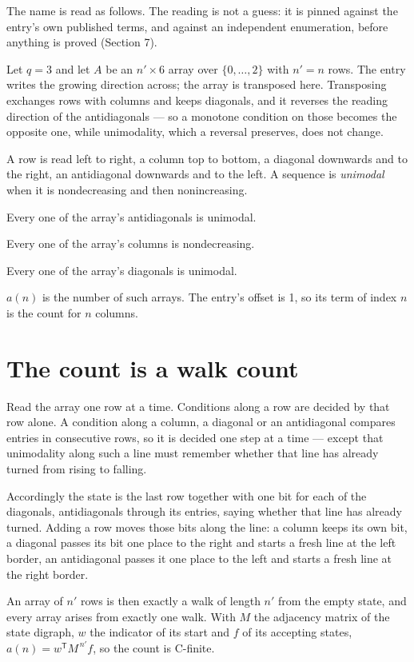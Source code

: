 \documentclass[11pt]{article}
\theoremstyle{definition}
\begin{document}
The name is read as follows. The reading is not a guess: it is pinned against the entry's own published terms, and against an independent enumeration, before anything is proved (Section 7).

Let $q = 3$ and let $A$ be an $n' \times 6$ array over $\{0,\dots,2\}$ with $n' = n$ rows. The entry writes the growing direction across; the array is transposed here. Transposing exchanges rows with columns and keeps diagonals, and it reverses the reading direction of the antidiagonals --- so a monotone condition on those becomes the opposite one, while unimodality, which a reversal preserves, does not change.

A row is read left to right, a column top to bottom, a diagonal downwards and to the right, an antidiagonal downwards and to the left. A sequence is {\itshape unimodal} when it is nondecreasing and then nonincreasing.

Every one of the array's antidiagonals is unimodal.

Every one of the array's columns is nondecreasing.

Every one of the array's diagonals is unimodal.

$a(n)$ is the number of such arrays. The entry's offset is 1, so its term of index $n$ is the count for $n$ columns.

\section{The count is a walk count}

Read the array one row at a time. Conditions along a row are decided by that row alone. A condition along a column, a diagonal or an antidiagonal compares entries in consecutive rows, so it is decided one step at a time --- except that unimodality along such a line must remember whether that line has already turned from rising to falling.

Accordingly the state is the last row together with one bit for each of the diagonals, antidiagonals through its entries, saying whether that line has already turned. Adding a row moves those bits along the line: a column keeps its own bit, a diagonal passes its bit one place to the right and starts a fresh line at the left border, an antidiagonal passes it one place to the left and starts a fresh line at the right border.

An array of $n'$ rows is then exactly a walk of length $n'$ from the empty state, and every array arises from exactly one walk. With $M$ the adjacency matrix of the state digraph, $w$ the indicator of its start and $f$ of its accepting states, $a(n) = w^{\mathsf T}M^{\,n'}f$, so the count is C-finite.
\end{document}
